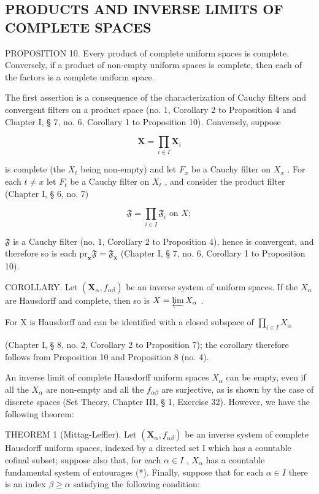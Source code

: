 \subsection{PRODUCTS AND INVERSE LIMITS OF COMPLETE SPACES}

PROPOSITION 10. Every product of complete uniform spaces is complete. Conversely, if a product of non-empty uniform spaces is complete, then each of the factors is a complete uniform space.

The first assertion is a consequence of the characterization of Cauchy filters and convergent filters on a product space (no. 1, Corollary 2 to Proposition 4 and Chapter I, § 7, no. 6, Corollary 1 to Proposition 10). Conversely, suppose

\[
\mathbf {X} = \prod_ {i \in I} \mathbf {X} _ {i}
\]

is complete (the \(X_{t}\) being non-empty) and let \(F_{x}\) be a Cauchy filter on \(X_{x}\) . For each \(t \neq x\) let \(F_{t}\) be a Cauchy filter on \(X_{t}\) , and consider the product filter (Chapter I, § 6, no. 7)

\[
\mathfrak {F} = \prod_ {i \in I} \mathfrak {F} _ {i} \text { on } X;
\]

\(\mathfrak{F}\) is a Cauchy filter (no. 1, Corollary 2 to Proposition 4), hence is convergent, and therefore so is each \(\mathrm{pr}_{\mathbf{x}}\mathfrak{F} = \mathfrak{F}_{\mathbf{x}}\) (Chapter I, § 7, no. 6, Corollary 1 to Proposition 10).

COROLLARY. Let \((\mathbf{X}_{\alpha}, f_{\alpha\beta})\) be an inverse system of uniform spaces. If the \(X_{\alpha}\) are Hausdorff and complete, then so is \(X = \varprojlim X_{\alpha}\) .

For X is Hausdorff and can be identified with a closed subspace of \(\prod_{i\in I}X_{\alpha}\)

(Chapter I, § 8, no. 2, Corollary 2 to Proposition 7); the corollary therefore follows from Proposition 10 and Proposition 8 (no. 4).

An inverse limit of complete Hausdorff uniform spaces \(X_{\alpha}\) can be empty, even if all the \(X_{\alpha}\) are non-empty and all the \(f_{\alpha\beta}\) are surjective, as is shown by the case of discrete spaces (Set Theory, Chapter III, § 1, Exercise 32). However, we have the following theorem:

THEOREM 1 (Mittag-Leffler). Let \((\mathbf{X}_{\alpha}, f_{\alpha\beta})\) be an inverse system of complete Hausdorff uniform spaces, indexed by a directed set I which has a countable cofinal subset; suppose also that, for each \(\alpha \in I\) , \(X_{\alpha}\) has a countable fundamental system of entourages (*). Finally, suppose that for each \(\alpha \in I\) there is an index \(\beta \geqslant \alpha\) satisfying the following condition:

